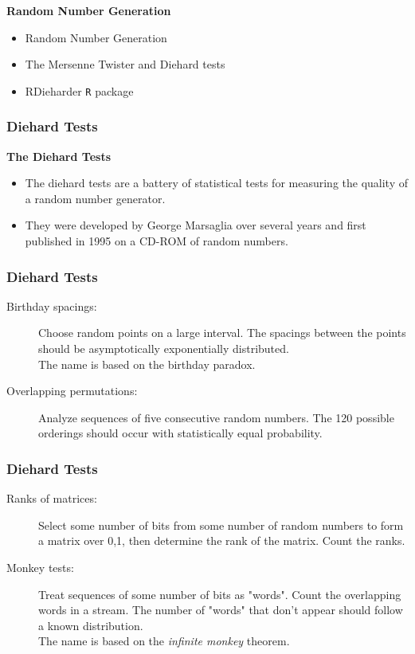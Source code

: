 \documentclass[MAIN.tex]{subfiles}
\begin{document}
 
	\begin{frame}[fragile]
		\Large
	\textbf{Random Number Generation}
	\begin{itemize}
	\item Random Number Generation
	\item The Mersenne Twister and Diehard tests
	\item RDieharder \texttt{R} package
	\end{itemize}
		
	\end{frame}
\begin{frame}[fragile]
\frametitle{Diehard Tests}
\textbf{The Diehard Tests}
\begin{itemize}
\item The diehard tests are a battery of statistical tests for measuring the quality of a random number generator. 
\item They were developed by George Marsaglia over several years and first published in 1995 on a CD-ROM of random numbers.
\end{itemize}


\end{frame}
\begin{frame}[fragile]
\frametitle{Diehard Tests}
\large
\begin{description}
\item[Birthday spacings:] Choose random points on a large interval. The spacings between the points should be asymptotically exponentially distributed.\\ The name is based on the birthday paradox. \bigskip
\item[Overlapping permutations:] Analyze sequences of five consecutive random numbers. The 120 possible orderings should occur with statistically equal probability.
\end{description}
\end{frame}
\begin{frame}[fragile]
\frametitle{Diehard Tests}
\large
\begin{description}
\item[Ranks of matrices:] Select some number of bits from some number of random numbers to form a matrix over {0,1}, then determine the rank of the matrix. Count the ranks. \bigskip
\item[Monkey tests:] Treat sequences of some number of bits as "words". Count the overlapping words in a stream. The number of "words" that don't appear should follow a known distribution.\\ The name is based on the \textit{infinite monkey} theorem.
\end{description}
\end{frame}
\end{document}
